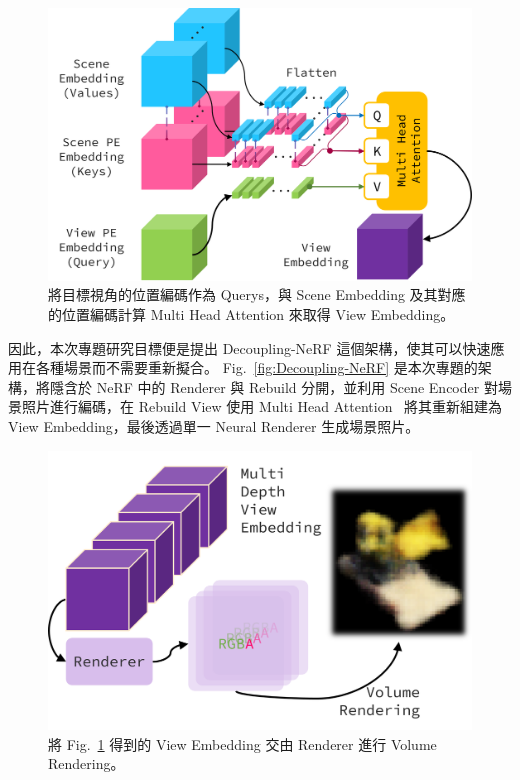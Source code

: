 \documentclass[10pt,twocolumn,letterpaper]{article}
\begin{document}
\begin{CJK}{UTF8}{bkai}
   \begin{figure}
      \begin{center}
         \includegraphics[width=1\linewidth]{img/rebuild-view.png}
      \end{center}
      \caption{
         將目標視角的位置編碼作為 Querys，與 Scene Embedding 及其對應的位置編碼計算
         Multi Head Attention 來取得 View Embedding。
      }
      \label{fig:rebuild-view}
   \end{figure}

   因此，本次專題研究目標便是提出 Decoupling-NeRF 這個架構，使其可以快速應用在各種場景而不需要重新擬合。
   Fig.~\ref{fig:Decoupling-NeRF} 是本次專題的架構，將隱含於 NeRF
   中的 Renderer 與 Rebuild 分開，並利用 Scene Encoder
   對場景照片進行編碼，在 Rebuild View 使用 Multi Head Attention~\cite{AttentionIsAllYouNeed}
   將其重新組建為 View Embedding，最後透過單一 Neural Renderer 生成場景照片。

   \begin{figure}[htbp]
      \begin{center}
         \includegraphics[width=1\linewidth]{img/render-view.png}
      \end{center}
      \caption{
         將 Fig.~\ref{fig:rebuild-view} 得到的 View Embedding 交由
         Renderer 進行 Volume Rendering。
      }
      \label{fig:render-view}
   \end{figure}

\end{CJK}
\end{document}
